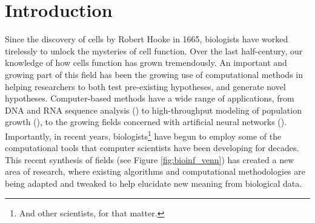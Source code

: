 \documentclass[12pt,twoside]{reedthesis}
\theoremstyle{definition}
\begin{document}
  \mainmatter %
  \pagestyle{fancyplain} %


    \chapter*{Introduction}

\onehalfspacing

Since the discovery of cells by Robert Hooke in 1665, biologists have worked tirelessly to unlock the mysteries of cell function. Over the last half-century, our knowledge of how cells function has grown tremendously. An important and growing part of this field has been the growing use of computational methods in helping researchers to both test pre-existing hypotheses, and generate novel hypotheses. Computer-based methods have a wide range of applications, from DNA and RNA sequence analysis (\cite{humanGenome}) to high-throughput modeling of population growth (\cite{Anderson2005}), to the growing fields concerned with artificial neural networks (\cite{Chon1996}). Importantly, in recent years, biologists\footnote{And other scientists, for that matter.} have begun to employ some of the computational tools that computer scientists have been developing for decades. This recent synthesis of fields (see Figure \ref{fig:bioinf_venn}) has created a new area of research, where existing algorithms and computational methodologies are being adapted and tweaked to help elucidate new meaning from biological data.\par
\end{document}
